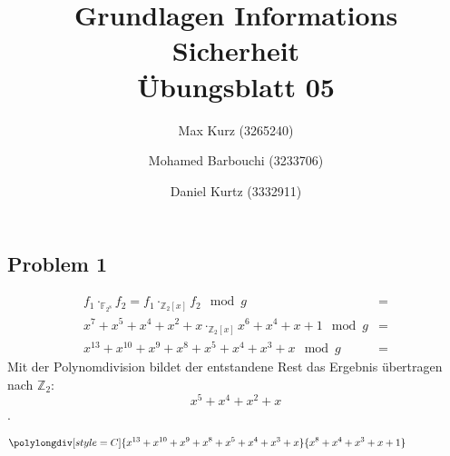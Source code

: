 \documentclass[12pt, german]{article}
\title{Grundlagen Informations Sicherheit \\ Übungsblatt 05}
\author{Max Kurz (3265240)  \and Mohamed Barbouchi (3233706) \and Daniel Kurtz (3332911)}
\date{}
\newcommand\scalemath[2]{\scalebox{#1}{\mbox{\ensuremath{\displaystyle #2}}}}
\begin{document}
	\maketitle
    \subsection*{Problem 1}
    
    \begin{align*}
    f_1 \cdot_{\mathbb{F}_{2^{8}}} f_2 = f_1 \cdot_{\mathbb{Z}_{2}[x]} f_2 \mod g &= \\
    x^7 + x^5 + x^4 +x^2 + x \cdot_{\mathbb{Z}_{2}[x]} x^6 + x^4 +x + 1 \mod g &= \\
    x^{13}+x^{10} +x^9 + x^8 + x^5 +x^4 + x^3 +x \mod g &=
    \end{align*}
   Mit der Polynomdivision bildet der entstandene Rest das Ergebnis übertragen nach $\mathbb{Z}_2$: \\
   $$x^5 +x^4 +x^2+x$$. 
   
 $\scalemath{0.8}{\polylongdiv[style=C]{x^{13}+x^{10} +x^9 + x^8 + x^5 +x^4 + x^3 +x}{x^8+x^4+x^3+x+1}}$
\end{document}
